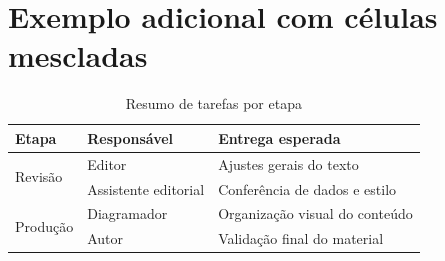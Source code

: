 \documentclass[11pt,a4paper]{article}
\begin{document}
\section*{Exemplo adicional com células mescladas}

\begin{table}[h]
\centering
\caption{Resumo de tarefas por etapa}
\begin{tabular}{|p{3.2cm}|p{3.8cm}|p{3.0cm}|}
\hline
\textbf{Etapa} & \textbf{Responsável} & \textbf{Entrega esperada} \\
\hline
\multirow{2}{*}{Revisão}
& Editor & Ajustes gerais do texto \\
\cline{2-3}
& Assistente editorial & Conferência de dados e estilo \\
\hline
\multirow{2}{*}{Produção}
& Diagramador & Organização visual do conteúdo \\
\cline{2-3}
& Autor & Validação final do material \\
\hline
\end{tabular}
\end{table}
\end{document}
